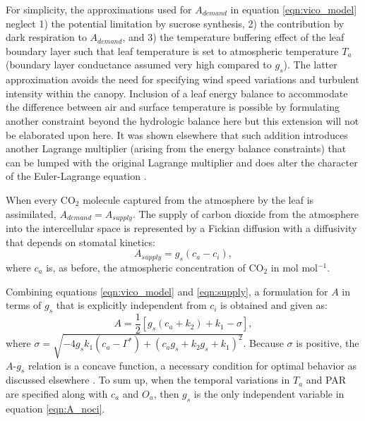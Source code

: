 \documentclass[utf8]{frontiersSCNS} %
\begin{document}
For simplicity, the approximations used for $A_{demand}$ in equation \ref{eqn:vico_model} neglect 1) the potential limitation by sucrose synthesis, 2) the contribution by dark respiration to $A_{demand}$, and 3) the temperature buffering effect of the leaf boundary layer such that leaf temperature is set to atmospheric temperature $T_a$ (boundary layer conductance assumed very high compared to $g_s$).  The latter approximation avoids the need for specifying wind speed variations and turbulent intensity within the canopy.  Inclusion of a leaf energy balance to accommodate the difference between air and surface temperature is possible by formulating another constraint beyond the hydrologic balance here \citep{roth2018fossil} but this extension will not be elaborated upon here.  It was shown elsewhere that such addition introduces another Lagrange multiplier (arising from the energy balance constraints) that can be lumped with the original Lagrange multiplier and does alter the character of the Euler-Lagrange equation \citep{roth2018fossil}.

When every CO$_2$ molecule captured from the atmosphere by the leaf is assimilated, $A_{demand} = A_{supply}$. The supply of carbon dioxide from the atmosphere into the intercellular space is represented by a Fickian diffusion  with a diffusivity that depends on stomatal kinetics:
\begin{equation}
    \label{eqn:supply}
    A_{supply} = g_s (c_a - c_i),
\end{equation}
where $c_a$ is, as before, the atmospheric concentration of CO$_2$ in mol mol$^{-1}$.


Combining equations \ref{eqn:vico_model} and \ref{eqn:supply}, a formulation for $A$ in terms of $g_s$ that is explicitly independent from $c_i$ is obtained and given as:
\begin{equation}
    \label{eqn:A_noci}
    A = \frac{1}{2} [g_s (c_a + k_2) + k_1 - \sigma],
\end{equation}
where $\sigma = \sqrt{-4 g_s k_1(c_a - \Gamma^*) + (c_a g_s + k_2 g_s + k_1)^2} $.  Because $\sigma$ is positive, the $A$-$g_s$ relation is a concave function, a necessary condition for optimal behavior as discussed elsewhere \citep{katul_stomatal_2009}. To sum up, when the temporal variations in $T_a$ and PAR are specified along with $c_a$ and $O_a$, then $g_s$ is the only independent variable in equation \ref{eqn:A_noci}.
\end{document}
